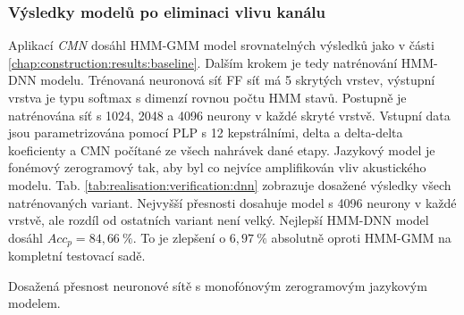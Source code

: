 \subsubsection{Výsledky modelů po eliminaci vlivu kanálu}

Aplikací \textit{CMN} dosáhl HMM-GMM model srovnatelných výsledků jako v části \ref{chap:construction:results:baseline}. Dalším krokem je tedy natrénování HMM-DNN modelu.
Trénovaná neuronová síť FF síť má 5 skrytých vrstev, výstupní vrstva je typu softmax s dimenzí rovnou počtu HMM stavů. Postupně je natrénována síť s 1024, 2048 a 4096 neurony v každé skryté vrstvě. Vstupní data jsou parametrizována pomocí PLP s 12 kepstrálními, delta a delta-delta koeficienty a CMN počítané ze všech nahrávek dané etapy. Jazykový model je fonémový zerogramový tak, aby byl co nejvíce amplifikován vliv akustického modelu. Tab. \ref{tab:realisation:verification:dnn} zobrazuje dosažené výsledky všech natrénovaných variant. Nejvyšší přesnosti dosahuje model s 4096 neurony v každé vrstvě, ale rozdíl od ostatních variant není velký. Nejlepší HMM-DNN model dosáhl $Acc_{p} = 84,66\ \%$. To je zlepšení o $6,97\ \%$ absolutně oproti HMM-GMM na kompletní testovací sadě.

\begin{table}[htpb]
  \centering
  \def\arraystretch{1.5}
  \caption{Dosažená přesnost neuronové sítě s monofónovým zerogramovým jazykovým modelem.}
  \label{tab:realisation:verification:dnn}
\end{table}
